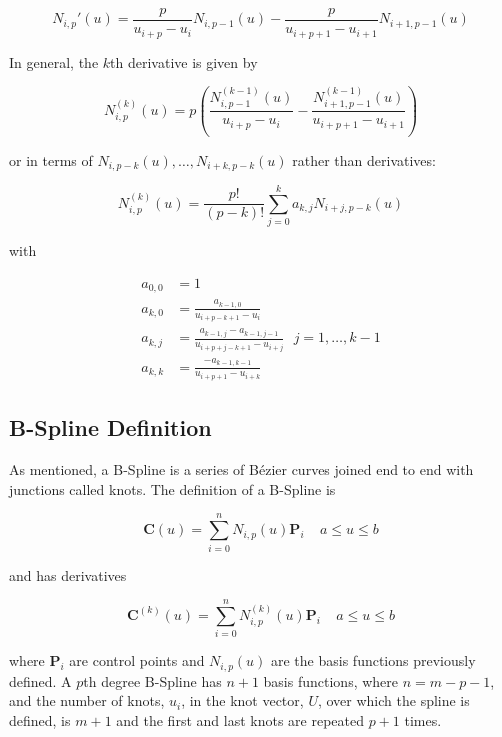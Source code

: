\begin{equation}N_{i,p}'(u) = \frac{p}{u_{i+p} - u_i} N_{i,p-1}(u) - \frac{p}{u_{i+p+1} - u_{i+1}} N_{i+1,p-1}(u)  \end{equation}

In general, the $k$th derivative is given by

\begin{equation}N_{i,p}^{(k)}(u) = p \left( \frac{N_{i,p-1}^{(k-1)}(u)}{u_{i+p} - u_i} - \frac{N_{i+1,p-1}^{(k-1)}(u)}{u_{i+p+1} - u_{i+1}} \right) \end{equation}

or in terms of $N_{i,p-k}(u), \ldots, N_{i+k,p-k}(u)$ rather than derivatives:

\begin{equation} N_{i,p}^{(k)}(u) = \frac{p!}{(p-k)!} \sum^k_{j=0} a_{k,j} N_{i+j,p-k}(u)  \end{equation}

with

\begin{align}
a_{0,0} &= 1\\
a_{k,0} &= \frac{a_{k-1,0}}{u_{i+p-k+1} - u_i}\\
a_{k,j} &= \frac{a_{k-1,j} - a_{k-1,j-1}}{u_{i+p+j-k+1} - u_{i+j} } ~~~ j=1,\ldots,k-1\\
a_{k,k} &= \frac{-a_{k-1,k-1}}{u_{i+p+1} - u_{i+k} }
\end{align}


\subsection{B-Spline Definition}
As mentioned, a B-Spline is a series of Bézier curves joined end to end with junctions called knots.  The definition of a B-Spline is

\begin{equation} \textbf{C}(u) = \sum^n_{i=0}N_{i,p}(u) \textbf{P}_i~~~~~a\leq u \leq b \end{equation}

and has derivatives

\begin{equation} \textbf{C}^{(k)}(u) = \sum^n_{i=0}N^{(k)}_{i,p}(u) \textbf{P}_i~~~~~a\leq u \leq b \end{equation}

where $\textbf{P}_i$ are control points and $N_{i,p}(u) $ are the basis functions previously defined. A $p$th degree B-Spline has $n+1$ basis functions, where $n = m-p-1$, and the number of knots, $u_i$, in the knot vector, $U$, over which the spline is defined, is $m+1$ and the first and last knots are repeated $p+1$ times.
 

